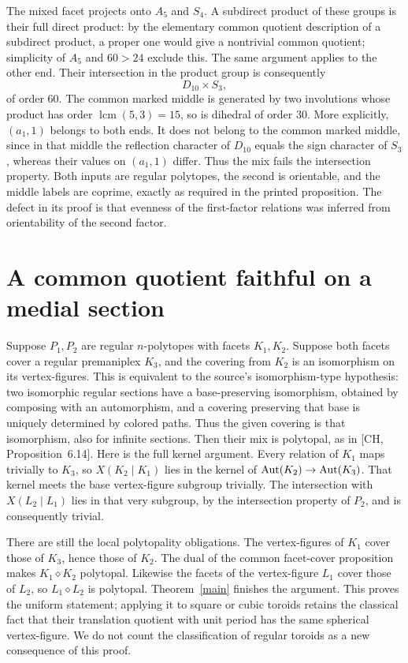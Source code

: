 \documentclass[a4paper,11pt]{article}
\newcommand{\mix}{\mathbin{\diamond}}\newcommand{\Alt}{\operatorname{Alt}}
\begin{document}
The mixed facet projects onto $A_5$ and $S_4$. A subdirect product of
these groups is their full direct product: by the elementary common
quotient description of a subdirect product, a proper one would give a
nontrivial common quotient; simplicity of $A_5$ and $60>24$ exclude this.
The same argument applies to the other end. Their intersection in the
product group is consequently
\[
 D_{10}\times S_3,
\]
of order $60$. The common marked middle is generated by two involutions
whose product has order $\operatorname{lcm}(5,3)=15$, so is dihedral of
order $30$. More explicitly, $(a_1,1)$ belongs to both ends. It does not
belong to the common marked middle, since in that middle the reflection
character of $D_{10}$ equals the sign character of $S_3$, whereas their
values on $(a_1,1)$ differ. Thus the mix fails the intersection property.
Both inputs are regular polytopes, the second is orientable, and the
middle labels are coprime, exactly as required in the printed proposition.
The defect in its proof is that evenness of the first-factor relations
was inferred from orientability of the second factor.

\section{A common quotient faithful on a medial section}
Suppose $P_1,P_2$ are regular $n$-polytopes with facets $K_1,K_2$.
Suppose both facets cover a regular premaniplex $K_3$, and the covering
from $K_2$ is an isomorphism on its vertex-figures. This is equivalent
to the source's isomorphism-type hypothesis: two isomorphic regular
sections have a base-preserving isomorphism, obtained by composing with
an automorphism, and a covering preserving that base is uniquely
determined by colored paths. Thus the given covering is that isomorphism,
also for infinite sections. Then their mix is
polytopal, as in [CH, Proposition~6.14]. Here is the full kernel argument.
Every relation of $K_1$ maps trivially to $K_3$, so
$X(K_2\mid K_1)$ lies in the kernel of $\operatorname{Aut}(K_2)\to\operatorname{Aut}(K_3)$.
That kernel meets the base vertex-figure subgroup trivially. The
intersection with $X(L_2\mid L_1)$ lies in that very subgroup, by the
intersection property of $P_2$, and is consequently trivial.

There are still the local polytopality obligations. The vertex-figures
of $K_1$ cover those of $K_3$, hence those of $K_2$. The dual of the
common facet-cover proposition makes $K_1\mix K_2$ polytopal.
Likewise the facets of the vertex-figure $L_1$ cover those of $L_2$,
so $L_1\mix L_2$ is polytopal. Theorem~\ref{main} finishes the argument.
This proves the uniform statement; applying it to square or cubic toroids
retains the classical fact that their translation quotient with unit
period has the same spherical vertex-figure. We do not count the
classification of regular toroids as a new consequence of this proof.
\end{document}

